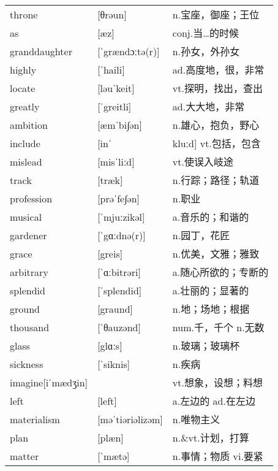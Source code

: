 \documentclass[a4paper]{article}
\begin{document}
\section{}
\begin{tabular}{l l l}

throne & [θrəun] & n.宝座，御座；王位 \\
as & [æz] & conj.当…的时候 \\
granddaughter & [ˈgrændɔːtə(r)] & n.孙女，外孙女 \\
highly & [ˈhaili] & ad.高度地，很，非常 \\
locate & [ləuˈkeit] & vt.探明，找出，查出 \\
greatly & [ˈgreitli] & ad.大大地，非常 \\
ambition & [æmˈbi∫ən] & n.雄心，抱负，野心 \\
include & [inˈ & kluːd] vt.包括，包含 \\
mislead & [misˈliːd] & vt.使误入岐途 \\
track & [træk] & n.行踪；路径；轨道 \\
profession & [prəˈfe∫ən] & n.职业 \\
musical & [ˈmjuːzikəl] & a.音乐的；和谐的 \\
gardener & [ˈgɑːdnə(r)] & n.园丁，花匠 \\
grace & [greis] & n.优美，文雅；雅致 \\
arbitrary & [ˈɑːbitrəri] & a.随心所欲的；专断的 \\
splendid & [ˈsplendid] & a.壮丽的；显著的 \\
ground & [graund] & n.地；场地；根据 \\
thousand & [ˈθauzənd] & num.千，千个 n.无数 \\
glass & [glɑːs] & n.玻璃；玻璃杯 \\
sickness & [ˈsiknis] & n.疾病 \\
imagine[iˈmædʒin] &  & vt.想象，设想；料想 \\
left & [left] & a.左边的 ad.在左边 \\
materialism & [məˈtiəriəlizəm] & n.唯物主义 \\
plan & [plæn] & n.\&vt.计划，打算 \\
matter & [ˈmætə] & n.事情；物质 vi.要紧 \\

\end{tabular}
\end{document}
